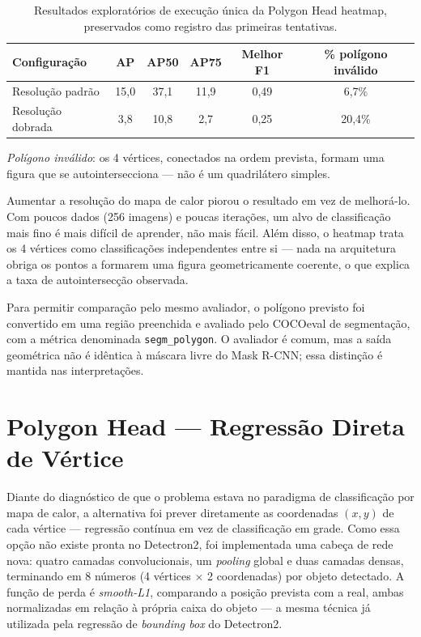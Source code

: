 \documentclass[11pt]{article}
\begin{document}
\begin{table}[H]
\centering
\caption{Resultados exploratórios de execução única da Polygon Head heatmap,
preservados como registro das primeiras tentativas.}
\begin{tabular}{lccccc}
\toprule
Configuração & AP & AP50 & AP75 & Melhor F1 & \% polígono inválido \\
\midrule
Resolução padrão & 15,0 & 37,1 & 11,9 & 0,49 & 6,7\% \\
Resolução dobrada & 3,8 & 10,8 & 2,7 & 0,25 & 20,4\% \\
\bottomrule
\end{tabular}
\end{table}

\noindent \textit{Polígono inválido}: os 4 vértices, conectados na ordem prevista,
formam uma figura que se autointersecciona --- não é um quadrilátero simples.

Aumentar a resolução do mapa de calor piorou o resultado em vez de melhorá-lo. Com
poucos dados (256 imagens) e poucas iterações, um alvo de classificação mais fino
é mais difícil de aprender, não mais fácil. Além disso, o heatmap trata os 4
vértices como classificações independentes entre si --- nada na arquitetura obriga
os pontos a formarem uma figura geometricamente coerente, o que explica a taxa de
autointersecção observada.

Para permitir comparação pelo mesmo avaliador, o polígono previsto foi convertido
em uma região preenchida e avaliado pelo COCOeval de segmentação, com a métrica
denominada \texttt{segm\_polygon}. O avaliador é comum, mas a saída geométrica não
é idêntica à máscara livre do Mask R-CNN; essa distinção é mantida nas
interpretações.

\section{Polygon Head --- Regressão Direta de Vértice}

Diante do diagnóstico de que o problema estava no paradigma de classificação por
mapa de calor, a alternativa foi prever diretamente as coordenadas $(x, y)$ de cada
vértice --- regressão contínua em vez de classificação em grade. Como essa opção
não existe pronta no Detectron2, foi implementada uma cabeça de rede nova: quatro
camadas convolucionais, um \textit{pooling} global e duas camadas densas,
terminando em 8 números (4 vértices $\times$ 2 coordenadas) por objeto detectado. A
função de perda é \textit{smooth-L1}, comparando a posição prevista com a real,
ambas normalizadas em relação à própria caixa do objeto --- a mesma técnica já
utilizada pela regressão de \textit{bounding box} do Detectron2.
\end{document}
